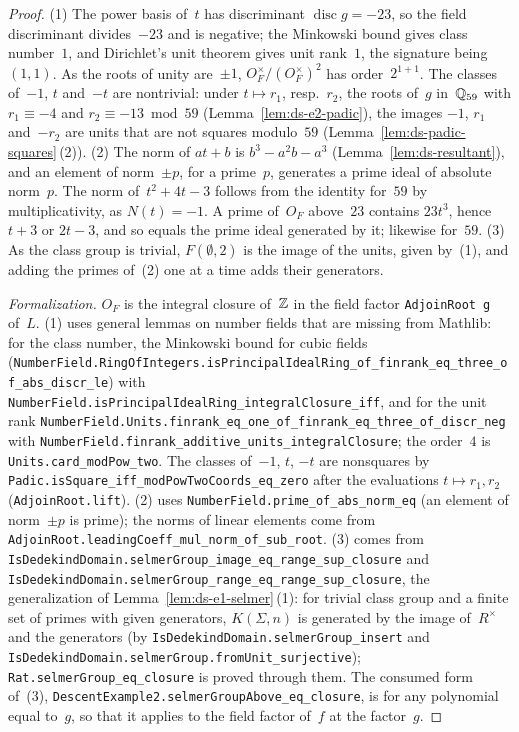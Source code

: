 \begin{proof}
\leanok
{}
(1) The power basis of~$t$ has discriminant $\operatorname{disc} g = -23$, so the field
discriminant divides~$-23$ and is negative; the Minkowski bound gives class number~$1$, and
Dirichlet's unit theorem gives unit rank~$1$, the signature being~$(1, 1)$. As the roots of unity
are~$\pm 1$, $O_F^\times/(O_F^\times)^2$ has order~$2^{1 + 1}$. The classes of~$-1$, $t$ and~$-t$
are nontrivial: under $t \mapsto r_1$, resp.~$r_2$, the roots of~$g$ in~$\mathbb{Q}_{59}$ with
$r_1 \equiv -4$ and $r_2 \equiv -13 \bmod 59$ (Lemma~\ref{lem:ds-e2-padic}), the images $-1$,
$r_1$ and~$-r_2$ are units that are not squares modulo~$59$
(Lemma~\ref{lem:ds-padic-squares}\,(2)). (2) The norm of $at + b$ is $b^3 - a^2b - a^3$
(Lemma~\ref{lem:ds-resultant}), and an element of norm~$\pm p$, for a prime~$p$, generates a prime
ideal of absolute norm~$p$. The norm of~$t^2 + 4t - 3$ follows from the identity for~$59$ by
multiplicativity, as $N(t) = -1$. A prime of~$O_F$ above~$23$ contains $23t^3$, hence $t + 3$ or
$2t - 3$, and so equals the prime ideal generated by it; likewise for~$59$. (3) As the class group
is trivial, $F(\emptyset, 2)$ is the image of the units, given by~(1), and adding the primes
of~(2) one at a time adds their generators.

\emph{Formalization.} $O_F$ is the integral closure of~$\mathbb{Z}$ in the field factor \texttt{AdjoinRoot
g} of~$L$. (1) uses general lemmas on number fields that are missing from Mathlib: for the class
number, the Minkowski bound for cubic fields
(\texttt{NumberField.RingOfIntegers.isPrincipalIdealRing\_of\_finrank\_eq\_three\_of\_abs\_discr\_le})
with \texttt{NumberField.isPrincipalIdealRing\_integralClosure\_iff}, and for the unit rank
\texttt{NumberField.Units.finrank\_eq\_one\_of\_finrank\_eq\_three\_of\_discr\_neg} with
\texttt{NumberField.finrank\_additive\_units\_integralClosure}; the order~$4$ is
\texttt{Units.card\_modPow\_two}. The classes of~$-1$, $t$, $-t$ are nonsquares by
\texttt{Padic.isSquare\_iff\_modPowTwoCoords\_eq\_zero} after the evaluations $t \mapsto r_1, r_2$
(\texttt{AdjoinRoot.lift}). (2) uses \texttt{NumberField.prime\_of\_abs\_norm\_eq} (an element of
norm~$\pm p$ is prime); the norms of linear elements come from
\texttt{AdjoinRoot.leadingCoeff\_mul\_norm\_of\_sub\_root}. (3) comes from
\texttt{IsDedekindDomain.selmerGroup\_image\_eq\_range\_sup\_closure} and
\texttt{IsDedekindDomain.selmerGroup\_range\_eq\_range\_sup\_closure}, the generalization of
Lemma~\ref{lem:ds-e1-selmer}\,(1): for trivial class group and a finite set of primes with given
generators, $K(\Sigma, n)$ is generated by the image of~$R^\times$ and the generators (by
\texttt{IsDedekindDomain.selmerGroup\_insert} and
\texttt{IsDedekindDomain.selmerGroup.fromUnit\_surjective}); \texttt{Rat.selmerGroup\_eq\_closure}
is proved through them. The consumed form of~(3),
\texttt{DescentExample2.selmerGroupAbove\_eq\_closure}, is for any polynomial equal to~$g$, so that
it applies to the field factor of~$f$ at the factor~$g$.
\end{proof}

